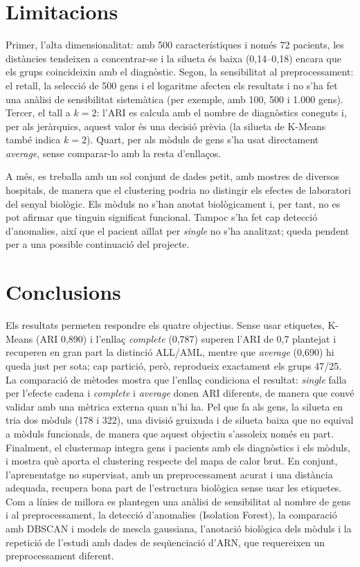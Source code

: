 \documentclass[11pt,a4paper]{article}
\begin{document}
\vspace{0.4cm}
\section{Limitacions}

Primer, l'alta dimensionalitat: amb 500 característiques i només 72 pacients, les distàncies tendeixen a concentrar-se i la silueta és baixa (0,14--0,18) encara que els grups coincideixin amb el diagnòstic. Segon, la sensibilitat al preprocessament: el retall, la selecció de 500 gens i el logaritme afecten els resultats i no s'ha fet una anàlisi de sensibilitat sistemàtica (per exemple, amb 100, 500 i 1.000 gens). Tercer, el tall a $k=2$: l'ARI es calcula amb el nombre de diagnòstics coneguts i, per als jeràrquics, aquest valor és una decisió prèvia (la silueta de K-Means també indica $k=2$). Quart, per als mòduls de gens s'ha usat directament \emph{average}, sense comparar-lo amb la resta d'enllaços.

A més, es treballa amb un sol conjunt de dades petit, amb mostres de diversos hospitals, de manera que el clustering podria no distingir els efectes de laboratori del senyal biològic. Els mòduls no s'han anotat biològicament i, per tant, no es pot afirmar que tinguin significat funcional. Tampoc s'ha fet cap detecció d'anomalies, així que el pacient aïllat per \emph{single} no s'ha analitzat; queda pendent per a una possible continuació del projecte.


\vspace{0.4cm}
\section{Conclusions}

Els resultats permeten respondre els quatre objectius. Sense usar etiquetes, K-Means (ARI 0,890) i l'enllaç \emph{complete} (0,787) superen l'ARI de 0,7 plantejat i recuperen en gran part la distinció ALL/AML, mentre que \emph{average} (0,690) hi queda just per sota; cap partició, però, reprodueix exactament els grups 47/25. La comparació de mètodes mostra que l'enllaç condiciona el resultat: \emph{single} falla per l'efecte cadena i \emph{complete} i \emph{average} donen ARI diferents, de manera que convé validar amb una mètrica externa quan n'hi ha. Pel que fa als gens, la silueta en tria dos mòduls (178 i 322), una divisió gruixuda i de silueta baixa que no equival a mòduls funcionals, de manera que aquest objectiu s'assoleix només en part. Finalment, el clustermap integra gens i pacients amb els diagnòstics i els mòduls, i mostra què aporta el clustering respecte del mapa de calor brut. En conjunt, l'aprenentatge no supervisat, amb un preprocessament acurat i una distància adequada, recupera bona part de l'estructura biològica sense usar les etiquetes. Com a línies de millora es plantegen una anàlisi de sensibilitat al nombre de gens i al preprocessament, la detecció d'anomalies (Isolation Forest), la comparació amb DBSCAN i models de mescla gaussiana, l'anotació biològica dels mòduls i la repetició de l'estudi amb dades de seqüenciació d'ARN, que requereixen un preprocessament diferent.
\end{document}
